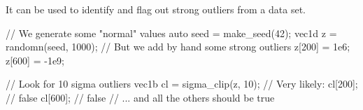 It can be used to identify and flag out strong outliers from a data set.

\begin{example}
\begin{cppcode}
// We generate some "normal" values
auto seed = make_seed(42);
vec1d z = randomn(seed, 1000);
// But we add by hand some strong outliers
z[200] = 1e6;
z[600] = -1e9;

// Look for 10 sigma outliers
vec1b cl = sigma_clip(z, 10);
// Very likely:
cl[200]; // false
cl[600]; // false
// ... and all the others should be true
\end{cppcode}
\end{example}
